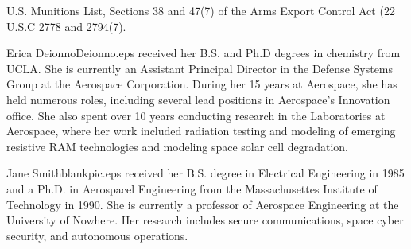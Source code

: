 \documentclass[twocolumn,letterpaper]{IEEEAerospaceCLS}  %
\begin{document}
\acknowledgments



%
\begin{thebibliography}{1}

U.S. Munitions List, Sections 38 and 47(7) of the Arms Export Control Act (22 U.S.C 2778 and 2794(7).


\end{thebibliography}


\thebiography
\begin{biographywithpic}
{Erica Deionno}{Deionno.eps}
received her B.S. and Ph.D degrees in chemistry from UCLA. She is currently an Assistant Principal Director in the Defense Systems Group at the Aerospace Corporation. During her 15 years at Aerospace, she has held numerous roles, including several lead positions in Aerospace's Innovation office. She also spent over 10 years conducting research in the Laboratories at Aerospace, where her work included radiation testing and modeling of emerging resistive RAM technologies and modeling space solar cell degradation.
\end{biographywithpic} 

\begin{biographywithpic}
{Jane Smith}{blankpic.eps}
received her B.S. degree in Electrical Engineering in 1985 and a Ph.D. in Aerospacel Engineering from the Massachusettes Institute of Technology in 1990. She is currently a professor of Aerospace Engineering at the University of Nowhere. Her research includes secure communications, space cyber security, and autonomous operations.

\end{biographywithpic}
\end{document}
